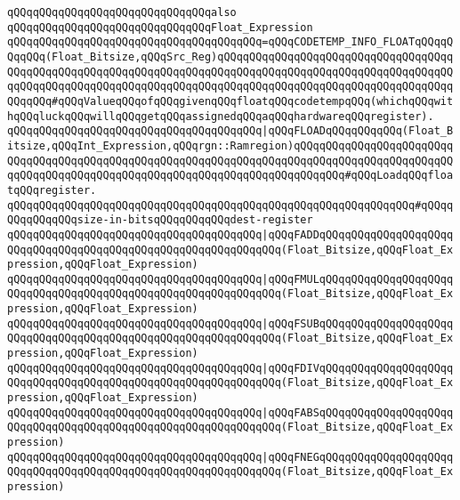 \verb|qQQqqQQqqQQqqQQqqQQqqQQqqQQqqQQqalso|\newline
\verb|qQQqqQQqqQQqqQQqqQQqqQQqqQQqqQQqFloat_Expression|\newline
\verb|qQQqqQQqqQQqqQQqqQQqqQQqqQQqqQQqqQQqqQQq=qQQqCODETEMP_INFO_FLOATqQQqqQQqqQQq(Float_Bitsize,qQQqSrc_Reg)qQQqqQQqqQQqqQQqqQQqqQQqqQQqqQQqqQQqqQQqqQQqqQQqqQQqqQQqqQQqqQQqqQQqqQQqqQQqqQQqqQQqqQQqqQQqqQQqqQQqqQQqqQQqqQQqqQQqqQQqqQQqqQQqqQQqqQQqqQQqqQQqqQQqqQQqqQQqqQQqqQQqqQQqqQQqqQQqqQQqqQQq#qQQqValueqQQqofqQQqgivenqQQqfloatqQQqcodetempqQQq(whichqQQqwithqQQqluckqQQqwillqQQqgetqQQqassignedqQQqaqQQqhardwareqQQqregister).|\newline
\verb|qQQqqQQqqQQqqQQqqQQqqQQqqQQqqQQqqQQqqQQq|\verb#|qQQqFLOADqQQqqQQqqQQq(Float_Bitsize,qQQqInt_Expression,qQQqrgn::Ramregion)qQQqqQQqqQQqqQQqqQQqqQQqqQQqqQQqqQQqqQQqqQQqqQQqqQQqqQQqqQQqqQQqqQQqqQQqqQQqqQQqqQQqqQQqqQQqqQQqqQQqqQQqqQQqqQQqqQQqqQQqqQQqqQQqqQQqqQQqqQQqqQQqqQQq#\verb|#qQQqLoadqQQqfloatqQQqregister.|\newline
\verb|qQQqqQQqqQQqqQQqqQQqqQQqqQQqqQQqqQQqqQQqqQQqqQQqqQQqqQQqqQQqqQQq#qQQqqQQqqQQqqQQqsize-in-bitsqQQqqQQqqQQqdest-register|\newline
\newline
\verb|qQQqqQQqqQQqqQQqqQQqqQQqqQQqqQQqqQQqqQQq|\verb#|qQQqFADDqQQqqQQqqQQqqQQqqQQqqQQqqQQqqQQqqQQqqQQqqQQqqQQqqQQqqQQqqQQqqQQq(Float_Bitsize,qQQqFloat_Expression,qQQqFloat_Expression)#\newline
\verb|qQQqqQQqqQQqqQQqqQQqqQQqqQQqqQQqqQQqqQQq|\verb#|qQQqFMULqQQqqQQqqQQqqQQqqQQqqQQqqQQqqQQqqQQqqQQqqQQqqQQqqQQqqQQqqQQqqQQq(Float_Bitsize,qQQqFloat_Expression,qQQqFloat_Expression)#\newline
\verb|qQQqqQQqqQQqqQQqqQQqqQQqqQQqqQQqqQQqqQQq|\verb#|qQQqFSUBqQQqqQQqqQQqqQQqqQQqqQQqqQQqqQQqqQQqqQQqqQQqqQQqqQQqqQQqqQQqqQQq(Float_Bitsize,qQQqFloat_Expression,qQQqFloat_Expression)#\newline
\verb|qQQqqQQqqQQqqQQqqQQqqQQqqQQqqQQqqQQqqQQq|\verb#|qQQqFDIVqQQqqQQqqQQqqQQqqQQqqQQqqQQqqQQqqQQqqQQqqQQqqQQqqQQqqQQqqQQqqQQq(Float_Bitsize,qQQqFloat_Expression,qQQqFloat_Expression)#\newline
\verb|qQQqqQQqqQQqqQQqqQQqqQQqqQQqqQQqqQQqqQQq|\verb#|qQQqFABSqQQqqQQqqQQqqQQqqQQqqQQqqQQqqQQqqQQqqQQqqQQqqQQqqQQqqQQqqQQqqQQq(Float_Bitsize,qQQqFloat_Expression)#\newline
\verb|qQQqqQQqqQQqqQQqqQQqqQQqqQQqqQQqqQQqqQQq|\verb#|qQQqFNEGqQQqqQQqqQQqqQQqqQQqqQQqqQQqqQQqqQQqqQQqqQQqqQQqqQQqqQQqqQQqqQQq(Float_Bitsize,qQQqFloat_Expression)#\newline
